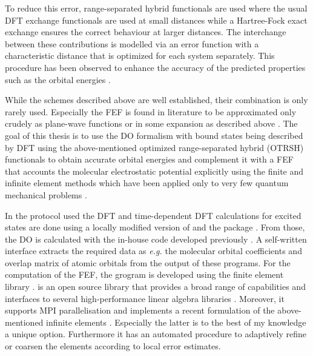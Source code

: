 To reduce this error, range-separated hybrid functionals are used where the usual DFT exchange functionals are used at small distances while a Hartree-Fock exact exchange ensures the correct behaviour at larger distances.
The interchange between these contributions is modelled via an error function with a characteristic distance that is optimized for each system separately.
This procedure has been observed to enhance the accuracy of the predicted properties such as the orbital energies \cite{Bokareva,GrellKuehn, Gerber, Gerber2}.

While the schemes described above are well established, their combination is only rarely used.
Especially the FEF is found in literature to be approximated only crudely as plane-wave functions \cite{planeWave} or in some expansion as described above \cite{ezDyson,MAgg,GrellKuehn}.
The goal of this thesis is to use the DO formalism with bound states being described by DFT using the above-mentioned optimized range-separated hybrid (OTRSH) functionals to obtain accurate orbital energies and complement it with a FEF that accounts the molecular electrostatic potential explicitly using the finite and infinite element methods which have been applied only to very few quantum mechanical problems \cite{sobaMolecule,bettessHarmonic}.

In the protocol used the DFT and time-dependent DFT calculations for excited states are done using a locally modified version of  \cite{nwchem} and the  package \cite{g09}.
From those, the DO is calculated with the in-house code  developed previously \cite{MAgg}.
A self-written interface extracts the required data as \textit{e.g.} the molecular orbital coefficients and overlap matrix of atomic orbitals from the output of these programs.
For the computation of the FEF, the grogram  is developed using the finite element library  \cite{libmesh}. 
 is an open source library that provides a broad range of capabilities and interfaces to several high-performance linear algebra libraries \cite{slepc1,slepc2,petsc}.
Moreover, it supports MPI parallelisation and implements a recent formulation of the above-mentioned infinite elements \cite{dreyer}.
Especially the latter is to the best of my knowledge a unique option.
Furthermore it has an automated procedure to adaptively refine or coarsen the elements according to local error estimates.

